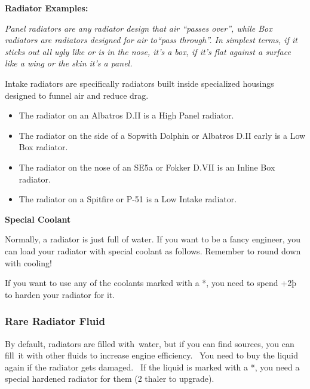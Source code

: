 \documentclass{article}
\begin{document}
\textbf{Radiator Examples: }

\emph{Panel radiators are any radiator design that air
    ``passes over'', while Box radiators are
    radiators designed for air to``pass
    through''. In simplest terms, if it sticks out all ugly
    like or is in the nose, it's a box, if
    it's flat against a surface like a wing
    or the skin it's a panel.}

Intake radiators are specifically radiators built inside
specialized housings designed to funnel air and reduce drag.

\begin{itemize}
    \item          The radiator on an Albatros D.II is a High Panel radiator.
    \item          The radiator on the side of a Sopwith Dolphin or Albatros D.II
          early is a Low Box radiator.
    \item          The radiator on the nose of an SE5a or Fokker D.VII is an
          Inline Box radiator.
    \item          The radiator on a Spitfire or P-51 is a Low Intake radiator.
\end{itemize}

\textbf{Special Coolant}

Normally, a radiator is just full of water. If you want to be a fancy
engineer, you can load your radiator with special coolant as follows.
Remember to round down with cooling!

If you want to use any of the coolants marked with a *, you need to
spend +2þ to harden your radiator for it.

\subsubsection{Rare Radiator Fluid}
\label{_Rare_Radiator_Fluid}

By default, radiators are filled with~water, but if you can find
sources, you can fill~it with other fluids to increase engine
efficiency.~ You need to buy the liquid again if the radiator gets
damaged.~ If the liquid is marked with a *, you need a special hardened
radiator for them (2 thaler to upgrade).
\end{document}

